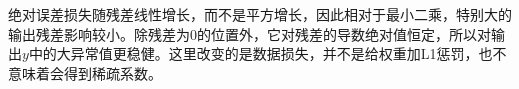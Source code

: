 绝对误差损失随残差线性增长，而不是平方增长，因此相对于最小二乘，特别大的输出残差影响较小。除残差为0的位置外，它对残差的导数绝对值恒定，所以对输出\(y\)中的大异常值更稳健。这里改变的是数据损失，并不是给权重加L1惩罚，也不意味着会得到稀疏系数。
